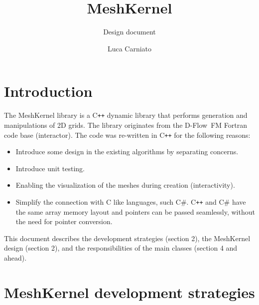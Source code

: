 \documentclass[biblatex]{deltares_manual}
\newcommand{\dflowfm}{D-Flow~FM\xspace}
\newcommand{\cpp}{\mbox{C\texttt{++}}\xspace}
\newcommand{\csharp}{C\#\xspace}
\begin{document}
\underline{}
\title{MeshKernel}
\subtitle{Design document}
\author{Luca Carniato}
\deltarestitle
\chapter{Introduction}

The MeshKernel library is a \cpp dynamic library that performs generation and manipulations of 2D grids. The library originates from the \dflowfm Fortran code base (interactor). The code was re-written in \cpp for the following reasons:
\begin{itemize}
\item Introduce some design in the existing algorithms by separating concerns.
\item Introduce unit testing.
\item Enabling the visualization of the meshes during creation (interactivity).
\item Simplify the connection with C like languages, such \csharp.
\cpp and \csharp have the same array memory layout and pointers can be passed seamlessly, without the need for pointer conversion.
\end{itemize}
This document describes the development strategies (section 2), the MeshKernel design (section 2), and the responsibilities of the main classes (section 4 and ahead).
\chapter{MeshKernel development strategies}
\end{document}
